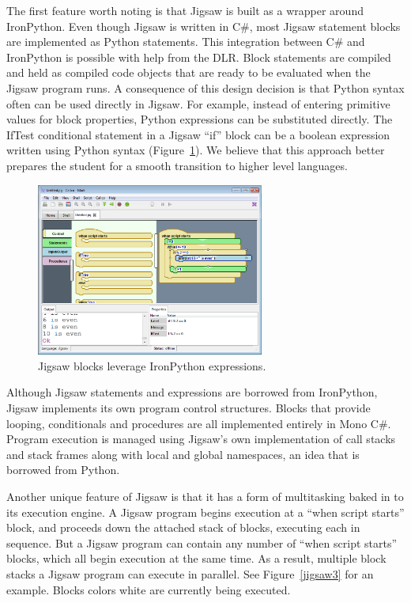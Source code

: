 \documentclass[preprint]{sigplanconf}
\begin{document}
The first feature worth noting is that Jigsaw is built as a
wrapper around IronPython. Even though Jigsaw is written in C\#, most
Jigsaw statement blocks are implemented as Python statements. This
integration between C\# and IronPython is possible with help from the
DLR. Block statements are compiled and held as compiled code objects
that are ready to be evaluated when the Jigsaw program runs. A
consequence of this design decision is that Python syntax often can be
used directly in Jigsaw. For example, instead of entering primitive
values for block properties, Python expressions can be substituted
directly. The IfTest conditional statement in a Jigsaw ``if'' block can be a
boolean expression written using Python syntax (Figure~\ref{jigsaw2}). We believe
that this approach better prepares the student for a smooth transition
to higher level languages.

\begin{figure}[h!]
  \centering
    \includegraphics[width=75mm]{jigsaw2.eps} 
  \caption{Jigsaw blocks leverage IronPython expressions.}
  \label{jigsaw2}
\end{figure}

Although Jigsaw statements and expressions are borrowed from
IronPython, Jigsaw implements its own program control
structures. Blocks that provide looping, conditionals and procedures
are all implemented entirely in Mono C\#. Program execution is managed
using Jigsaw's own implementation of call stacks and stack frames
along with local and global namespaces, an idea that is borrowed from
Python.

Another unique feature of Jigsaw is that it has a form of multitasking
baked in to its execution engine. A Jigsaw program begins
execution at a ``when script starts'' block, and proceeds down the
attached stack of blocks, executing each in sequence. But a Jigsaw
program can contain any number of ``when script starts'' blocks, which
all begin execution at the same time. As a result, multiple block
stacks a Jigsaw program can execute in parallel. See Figure~\ref{jigsaw3} 
for an example. Blocks colors white are currently being executed. 
\end{document}
